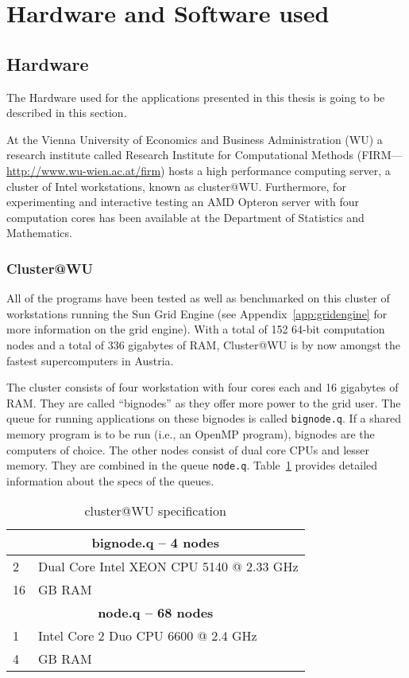 

\section{Hardware and Software used}
\label{sec:hardwaresoftware}

\subsection{Hardware}
The Hardware used for the applications presented in this thesis is
going to be described in this section.

At the Vienna University of Economics and Business Administration (WU)
a research institute called Research Institute for Computational
Methods (FIRM---\url{http://www.wu-wien.ac.at/firm}) hosts a high
performance computing server, a cluster of Intel workstations, known
as cluster@WU.
Furthermore, for experimenting and interactive testing an AMD Opteron
server with four computation cores has been available at the
Department of Statistics and Mathematics. 

\subsubsection{Cluster@WU}
All of the programs
have been tested as well as benchmarked on this cluster of
workstations running the Sun Grid 
Engine (see Appendix~\ref{app:gridengine} for more information on the
grid engine). With a total of 152 64-bit computation nodes and a total
of 336 gigabytes of RAM, Cluster@WU is by now amongst the fastest
supercomputers in Austria.

The cluster consists of four workstation with four cores each and 16
gigabytes of RAM. They are called ``bignodes'' as they offer more
power to the grid user. The queue for running applications on these
bignodes is called \texttt{bignode.q}. If a shared memory program is
to be run (i.e., an OpenMP program), bignodes are the computers of choice.
The other nodes consist of dual core CPUs and lesser
memory. They are combined in the queue
\texttt{node.q}. Table~\ref{tab:clusterWU} provides detailed
information about the specs of the queues.

\begin{table}[h!b!p!]
\caption{cluster@WU specification}
\centering
\label{tab:clusterWU}
\begin{tabular}{|l|l|}
\hline
\multicolumn{2}{|c|}{\textbf{bignode.q -- 4 nodes}}\\
\hline
2  & Dual Core Intel XEON CPU 5140 @ 2.33 GHz\\
16 & GB RAM\\
\hline
\multicolumn{2}{|c|}{\textbf{node.q -- 68 nodes}}\\
\hline
1 & Intel Core 2 Duo CPU 6600 @ 2.4 GHz\\
4 & GB RAM\\
\hline
\end{tabular}
\end{table}

